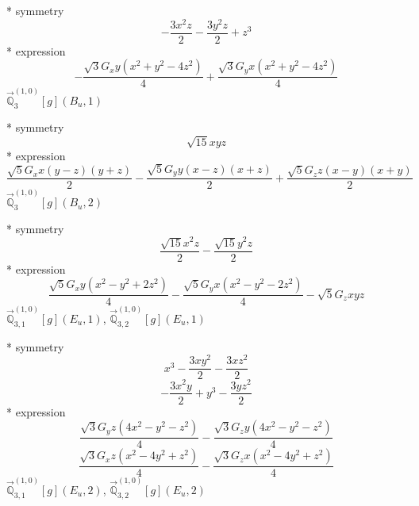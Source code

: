 \documentclass[fleqn,8pt]{jsarticle}
\begin{document}
\noindent\quad ** symmetry
\begin{dmath*}
- \frac{3 x^{2} z}{2} - \frac{3 y^{2} z}{2} + z^{3}
\end{dmath*}
\noindent\quad ** expression
\begin{dmath*}
- \frac{\sqrt{3} G_{x} y \left(x^{2} + y^{2} - 4 z^{2}\right)}{4} + \frac{\sqrt{3} G_{y} x \left(x^{2} + y^{2} - 4 z^{2}\right)}{4}
\end{dmath*}
\noindent\quad $\vec{\mathbb{Q}}_{3}^{(1,0)}[g](B_{u},1)$

\noindent\quad ** symmetry
\begin{dmath*}
\sqrt{15} x y z
\end{dmath*}
\noindent\quad ** expression
\begin{dmath*}
\frac{\sqrt{5} G_{x} x \left(y - z\right) \left(y + z\right)}{2} - \frac{\sqrt{5} G_{y} y \left(x - z\right) \left(x + z\right)}{2} + \frac{\sqrt{5} G_{z} z \left(x - y\right) \left(x + y\right)}{2}
\end{dmath*}
\noindent\quad $\vec{\mathbb{Q}}_{3}^{(1,0)}[g](B_{u},2)$

\noindent\quad ** symmetry
\begin{dmath*}
\frac{\sqrt{15} x^{2} z}{2} - \frac{\sqrt{15} y^{2} z}{2}
\end{dmath*}
\noindent\quad ** expression
\begin{dmath*}
\frac{\sqrt{5} G_{x} y \left(x^{2} - y^{2} + 2 z^{2}\right)}{4} - \frac{\sqrt{5} G_{y} x \left(x^{2} - y^{2} - 2 z^{2}\right)}{4} - \sqrt{5} G_{z} x y z
\end{dmath*}
\noindent\quad $\vec{\mathbb{Q}}_{3,1}^{(1,0)}[g](E_{u},1)$, $\vec{\mathbb{Q}}_{3,2}^{(1,0)}[g](E_{u},1)$

\noindent\quad ** symmetry
\begin{dmath*}
x^{3} - \frac{3 x y^{2}}{2} - \frac{3 x z^{2}}{2}
\end{dmath*}
\begin{dmath*}
- \frac{3 x^{2} y}{2} + y^{3} - \frac{3 y z^{2}}{2}
\end{dmath*}
\noindent\quad ** expression
\begin{dmath*}
\frac{\sqrt{3} G_{y} z \left(4 x^{2} - y^{2} - z^{2}\right)}{4} - \frac{\sqrt{3} G_{z} y \left(4 x^{2} - y^{2} - z^{2}\right)}{4}
\end{dmath*}
\begin{dmath*}
\frac{\sqrt{3} G_{x} z \left(x^{2} - 4 y^{2} + z^{2}\right)}{4} - \frac{\sqrt{3} G_{z} x \left(x^{2} - 4 y^{2} + z^{2}\right)}{4}
\end{dmath*}
\noindent\quad $\vec{\mathbb{Q}}_{3,1}^{(1,0)}[g](E_{u},2)$, $\vec{\mathbb{Q}}_{3,2}^{(1,0)}[g](E_{u},2)$
\end{document}
